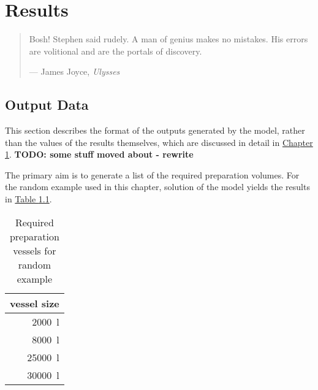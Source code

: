 %
%
%
%

\chapter{Results}\label{C.results}

\begin{quote}
Bosh! Stephen said rudely.
A man of genius makes no mistakes.
His errors are volitional and are the portals of discovery.

\hspace{2cm}--- James Joyce, \emph{Ulysses}
\end{quote}

\section{Output Data}\label{S.outputdata}

This section describes the format of the outputs generated by the model, rather
than the values of the results themselves, which are discussed in detail in 
\hyperref[C.results]{Chapter \ref*{C.results}}.
\textbf{TODO: some stuff moved about - rewrite}

The primary aim is to generate a list of the required preparation volumes.
For the random example used in this chapter, solution of the model yields
the results in \hyperref[tbl.reqvessels]{Table \ref*{tbl.reqvessels}}.

\begin{table}[h!]
    \centering
    \caption{Required preparation vessels for random example}
    \label{tbl.reqvessels}
    \begin{tabular}{r}
        vessel size\\ \hline
        \SI{2000}{\litre}\\
        \SI{8000}{\litre}\\
        \SI{25000}{\litre}\\
        \SI{30000}{\litre}\\
    \end{tabular}
\end{table}

